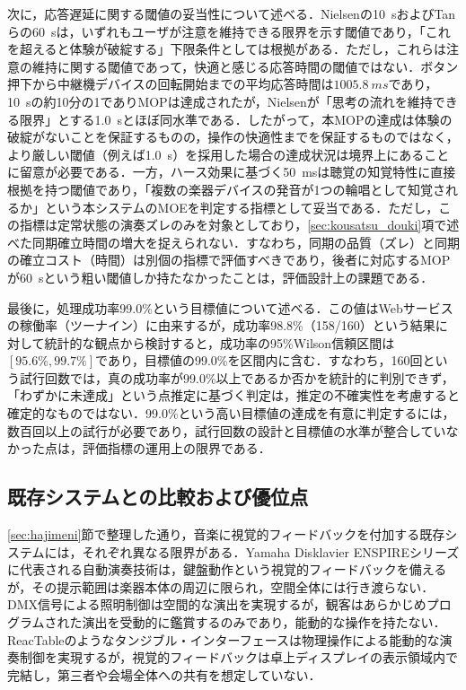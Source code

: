 次に，応答遅延に関する閾値の妥当性について述べる．Nielsenの\SI{10}{s}\cite{nielsen1993}およびTanらの\SI{60}{s}\cite{tan2026}は，いずれもユーザが注意を維持できる限界を示す閾値であり，「これを超えると体験が破綻する」下限条件としては根拠がある．ただし，これらは注意の維持に関する閾値であって，快適と感じる応答時間の閾値ではない．ボタン押下から中継機デバイスの回転開始までの平均応答時間は$\SI{1005.8}{ms}$であり，\SI{10}{s}の約10分の1でありMOPは達成されたが，Nielsenが「思考の流れを維持できる限界」とする\SI{1.0}{s}\cite{nielsen1993}とほぼ同水準である．したがって，本MOPの達成は体験の破綻がないことを保証するものの，操作の快適性までを保証するものではなく，より厳しい閾値（例えば\SI{1.0}{s}）を採用した場合の達成状況は境界上にあることに留意が必要である．一方，ハース効果に基づく\SI{50}{ms}\cite{haas1951}は聴覚の知覚特性に直接根拠を持つ閾値であり，「複数の楽器デバイスの発音が1つの輪唱として知覚されるか」という本システムのMOEを判定する指標として妥当である．ただし，この指標は定常状態の演奏ズレのみを対象としており，\ref{sec:kousatsu_douki}項で述べた同期確立時間の増大を捉えられない．すなわち，同期の品質（ズレ）と同期の確立コスト（時間）は別個の指標で評価すべきであり，後者に対応するMOPが\SI{60}{s}という粗い閾値しか持たなかったことは，評価設計上の課題である．

最後に，処理成功率99.0\%\cite{kobesoft_availability}という目標値について述べる．この値はWebサービスの稼働率（ツーナイン）に由来するが，成功率98.8\%（158/160）という結果に対して統計的な観点から検討すると，成功率の95\%Wilson信頼区間\cite{wilson1927}は$[95.6\%, 99.7\%]$であり，目標値の99.0\%を区間内に含む．すなわち，160回という試行回数では，真の成功率が99.0\%以上であるか否かを統計的に判別できず，「わずかに未達成」という点推定に基づく判定は，推定の不確実性を考慮すると確定的なものではない．99.0\%という高い目標値の達成を有意に判定するには，数百回以上の試行が必要であり，試行回数の設計と目標値の水準が整合していなかった点は，評価指標の運用上の限界である．

\subsection{既存システムとの比較および優位点}
\label{sec:kousatsu_hikaku}

\ref{sec:hajimeni}節で整理した通り，音楽に視覚的フィードバックを付加する既存システムには，それぞれ異なる限界がある．Yamaha Disklavier ENSPIREシリーズ\cite{yamaha}に代表される自動演奏技術は，鍵盤動作という視覚的フィードバックを備えるが，その提示範囲は楽器本体の周辺に限られ，空間全体には行き渡らない．DMX信号による照明制御\cite{sekine2021}は空間的な演出を実現するが，観客はあらかじめプログラムされた演出を受動的に鑑賞するのみであり，能動的な操作を持たない．ReacTable\cite{reactable}のようなタンジブル・インターフェースは物理操作による能動的な演奏制御を実現するが，視覚的フィードバックは卓上ディスプレイの表示領域内で完結し，第三者や会場全体への共有を想定していない．


